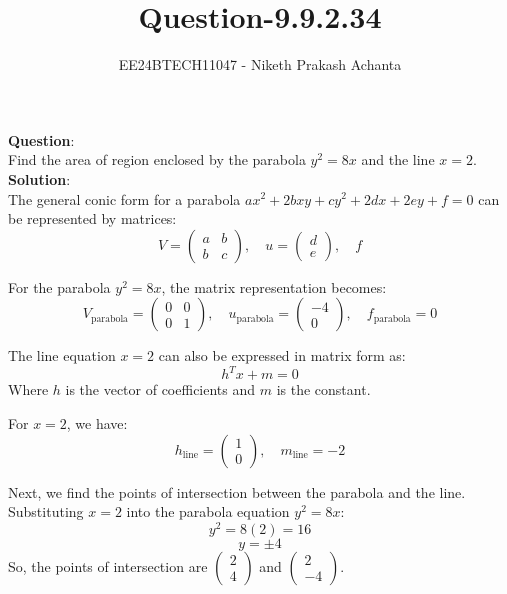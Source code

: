 \documentclass[journal]{IEEEtran}
\begin{document}

\title{Question-9.9.2.34}
\author{EE24BTECH11047 - Niketh Prakash Achanta}
{\let\newpage\relax\maketitle}
\vspace{-10mm}
\textbf{Question}:\\
Find the area of region enclosed by the parabola $y^2 = 8x$ and the line $x = 2$.\\
\textbf{Solution}:\\

The general conic form for a parabola $ax^2 + 2bxy + cy^2 + 2dx + 2ey + f = 0$ can be represented by matrices:
\begin{equation}
V = \begin{pmatrix} a & b \\ b & c \end{pmatrix}, \quad u = \begin{pmatrix} d \\ e \end{pmatrix}, \quad f
\end{equation}

For the parabola $y^2 = 8x$, the matrix representation becomes:
\begin{equation}
V_{\text{parabola}} = \begin{pmatrix} 0 & 0 \\ 0 & 1 \end{pmatrix}, \quad u_{\text{parabola}} = \begin{pmatrix} -4 \\ 0 \end{pmatrix}, \quad f_{\text{parabola}} = 0
\end{equation}

The line equation $x = 2$ can also be expressed in matrix form as:
\begin{equation}
h^T x + m = 0
\end{equation}
Where $h$ is the vector of coefficients and $m$ is the constant.

For $x = 2$, we have:
\begin{equation}
h_{\text{line}} = \begin{pmatrix} 1 \\ 0 \end{pmatrix}, \quad m_{\text{line}} = -2
\end{equation}

Next, we find the points of intersection between the parabola and the line. Substituting $x = 2$ into the parabola equation $y^2 = 8x$:
\begin{equation}
y^2 = 8(2) = 16
\end{equation}
\begin{equation}
y = \pm 4
\end{equation}
So, the points of intersection are $\begin{pmatrix} 2 \\ 4 \end{pmatrix}$ and $\begin{pmatrix} 2 \\ -4 \end{pmatrix}$.
\end{document}
